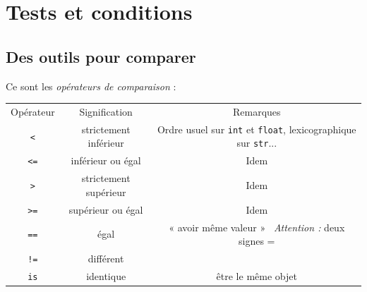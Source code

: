 \chapter{Tests et conditions}
\section{Des outils pour comparer}

Ce sont les \textit{opérateurs de comparaison} :\\

{\small
\tabstyle[UGLiBlue]
\begin{tabular}{CCC}
	\ccell Opérateur            & \ccell Signification  & \ccell Remarques                                                                                                        \\
	
	\texttt{<}      & strictement inférieur & Ordre usuel sur \texttt{int} et \texttt{float}, lexicographique sur \texttt{str}... \\
	
	\texttt{<=}     & inférieur ou égal     & Idem                                                                                                                    \\
	
	\texttt{>}      & strictement supérieur & Idem                                                                                                                    \\
	
	\texttt{>=}     & supérieur ou égal     & Idem                                                                                                                    \\
	
	\texttt{==}     & égal                  & «  avoir même valeur » \  \textit{Attention :} deux signes =                                                            \\
	
	\texttt{!=}     & différent             &                                                                                                                         \\
	
	\texttt{is}     & identique             & être le même objet                                                                                                      \\
	

\end{tabular}}
